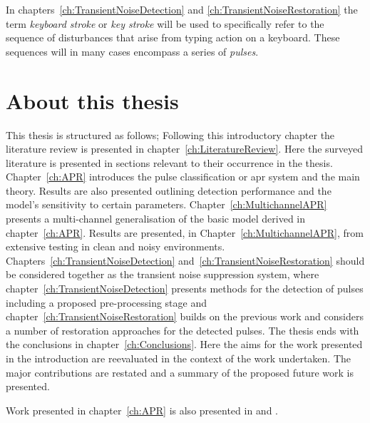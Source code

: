 In chapters~\ref{ch:TransientNoiseDetection} and \ref{ch:TransientNoiseRestoration} the term \emph{keyboard stroke} or \emph{key stroke} will be used to specifically refer to the sequence of disturbances that arise from typing action on a keyboard. These sequences will in many cases encompass a series of \emph{pulses}.


\section{About this thesis}
This thesis is structured as follows; Following this introductory chapter the literature review is presented in chapter~\ref{ch:LiteratureReview}. Here the surveyed literature is presented in sections relevant to their occurrence in the thesis. Chapter~\ref{ch:APR} introduces the pulse classification or \gls{apr} system and the main theory. Results are also presented outlining detection performance and the model's sensitivity to certain parameters. Chapter~\ref{ch:MultichannelAPR} presents a multi-channel generalisation of the basic model derived in chapter~\ref{ch:APR}. Results are presented, in Chapter~\ref{ch:MultichannelAPR}, from extensive testing in clean and noisy environments. Chapters~\ref{ch:TransientNoiseDetection} and~\ref{ch:TransientNoiseRestoration} should be considered together as the transient noise suppression system, where chapter~\ref{ch:TransientNoiseDetection} presents methods for the detection of pulses including a proposed pre-processing stage and chapter~\ref{ch:TransientNoiseRestoration} builds on the previous work and considers a number of restoration approaches for the detected pulses. The thesis ends with the conclusions in chapter~\ref{ch:Conclusions}. Here the aims for the work presented in the introduction are reevaluated in the context of the work undertaken. The major contributions are restated and a summary of the proposed future work is presented.

Work presented in chapter~\ref{ch:APR} is also presented in \cite{Christensen2011} and \cite{US20110316784}.


